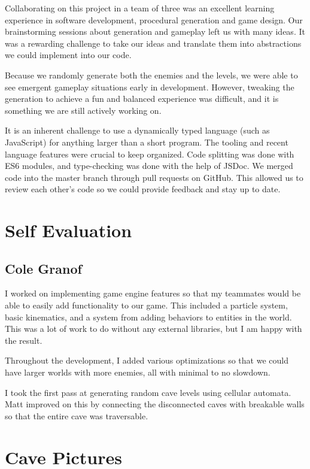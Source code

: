 \documentclass[a4paper, 12pt]{article}
\begin{document}
Collaborating on this project in a team of three was an excellent learning
experience in software development, procedural generation and game design. Our
brainstorming sessions about generation and gameplay left us with many ideas. It
was a rewarding challenge to take our ideas and translate them into abstractions
we could implement into our code.

Because we randomly generate both the enemies and the levels, we were able to
see emergent gameplay situations early in development. However, tweaking the
generation to achieve a fun and balanced experience was difficult, and it is
something we are still actively working on.

It is an inherent challenge to use a dynamically typed language (such as
JavaScript) for anything larger than a short program. The tooling and recent
language features were crucial to keep organized. Code splitting was done with
ES6 modules, and type-checking was done with the help of JSDoc. We merged code
into the master branch through pull requests on GitHub. This allowed us to
review each other's code so we could provide feedback and stay up to date.



\section{Self Evaluation}

\subsection{Cole Granof}

I worked on implementing game engine features so that my teammates would be able
to easily add functionality to our game. This included a particle system, basic
kinematics, and a system from adding behaviors to entities in the world. This
was a lot of work to do without any external libraries, but I am happy with the
result.

Throughout the development, I added various optimizations so that we could have
larger worlds with more enemies, all with minimal to no slowdown.

I took the first pass at generating random cave levels using cellular automata.
Matt improved on this by connecting the disconnected caves with breakable walls
so that the entire cave was traversable.

\section{Cave Pictures}
\label{sec:cavePictures}
\end{document}
